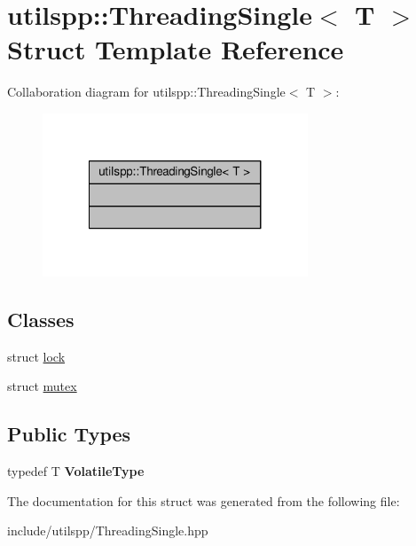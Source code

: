 \hypertarget{structutilspp_1_1ThreadingSingle}{\section{utilspp\-:\-:Threading\-Single$<$ T $>$ Struct Template Reference}
\label{structutilspp_1_1ThreadingSingle}
}


Collaboration diagram for utilspp\-:\-:Threading\-Single$<$ T $>$\-:\nopagebreak
\begin{figure}[H]
\begin{center}
\leavevmode
\includegraphics[width=224pt]{structutilspp_1_1ThreadingSingle__coll__graph}
\end{center}
\end{figure}
\subsection*{Classes}
\begin{DoxyCompactItemize}
\item 
struct \hyperlink{structutilspp_1_1ThreadingSingle_1_1lock}{lock}
\item 
struct \hyperlink{structutilspp_1_1ThreadingSingle_1_1mutex}{mutex}
\end{DoxyCompactItemize}
\subsection*{Public Types}
\begin{DoxyCompactItemize}
\item 
\hypertarget{structutilspp_1_1ThreadingSingle_a291a5312fb48ca55f8641b8aad31945c}{typedef T {\bfseries Volatile\-Type}}\label{structutilspp_1_1ThreadingSingle_a291a5312fb48ca55f8641b8aad31945c}

\end{DoxyCompactItemize}


The documentation for this struct was generated from the following file\-:\begin{DoxyCompactItemize}
\item 
include/utilspp/Threading\-Single.\-hpp\end{DoxyCompactItemize}
